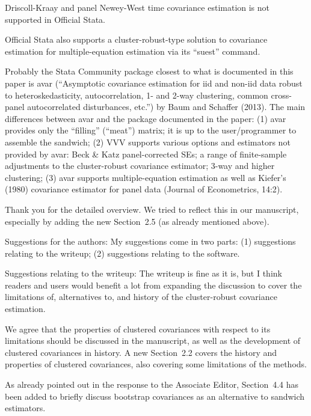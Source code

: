 \documentclass[american,foldmarks=false]{uibklttr}
\newenvironment{review}{\fontshape{\itdefault}\fontseries{\bfdefault} \selectfont \smallskip}{\par}
\begin{document}
\begin{review}
Driscoll-Kraay and panel Newey-West time covariance estimation is not supported
in Official Stata.

Official Stata also supports a cluster-robust-type solution to covariance
estimation for multiple-equation estimation via its ``suest'' command.

Probably the Stata Community package closest to what is documented in this paper
is avar (``Asymptotic covariance estimation for iid and non-iid data robust to
heteroskedasticity, autocorrelation, 1- and 2-way clustering, common cross-panel
autocorrelated disturbances, etc.'') by Baum and Schaffer (2013).  The main
differences between avar and the package documented in the paper: (1) avar
provides only the ``filling'' (``meat'') matrix; it is up to the user/programmer
to assemble the sandwich; (2) VVV supports various options and estimators not
provided by avar: Beck \& Katz panel-corrected SEs; a range of finite-sample
adjustments to the cluster-robust covariance estimator; 3-way and higher
clustering; (3) avar supports multiple-equation estimation as well as Kiefer's
(1980) covariance estimator for panel data (Journal of Econometrics, 14:2).
\end{review}

Thank you for the detailed overview. We tried to reflect this in our manuscript,
especially by adding the new Section~2.5 (as already mentioned above).


\begin{review}
Suggestions for the authors:
My suggestions come in two parts: (1) suggestions relating to the writeup; (2)
suggestions relating to the software.

Suggestions relating to the writeup:
The writeup is fine as it is, but I think readers and users would benefit a lot
from expanding the discussion to cover the limitations of, alternatives to, and
history of the cluster-robust covariance estimation.
\end{review}

We agree that the properties of clustered covariances with respect to its
limitations should be discussed in the manuscript, as well as the development of
clustered covariances in history. A new Section~2.2 covers the history and
properties of clustered covariances, also covering some limitations of the
methods.

As already pointed out in the response to the Associate Editor, Section~4.4 has
been added to briefly discuss bootstrap covariances as an alternative to
sandwich estimators. 
\end{document}
